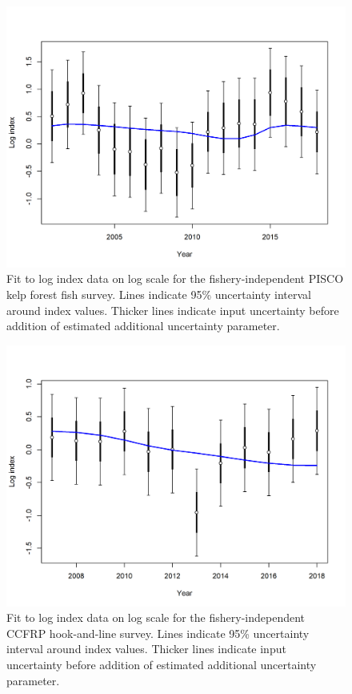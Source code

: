 \documentclass[12pt,]{article}
\begin{document}
\begin{figure}
\centering
\includegraphics{r4ss/plots_mod1/index5_logcpuefit_PISCO.png}
\caption{Fit to log index data on log scale for the fishery-independent
PISCO kelp forest fish survey. Lines indicate 95\% uncertainty interval
around index values. Thicker lines indicate input uncertainty before
addition of estimated additional uncertainty parameter.
\label{fig:index5_logcpuefit_PISCO}}
\end{figure}

\begin{figure}
\centering
\includegraphics{r4ss/plots_mod1/index5_logcpuefit_CCFRP.png}
\caption{Fit to log index data on log scale for the fishery-independent
CCFRP hook-and-line survey. Lines indicate 95\% uncertainty interval
around index values. Thicker lines indicate input uncertainty before
addition of estimated additional uncertainty parameter.
\label{fig:index5_logcpuefit_CCFRP}}
\end{figure}
\end{document}
